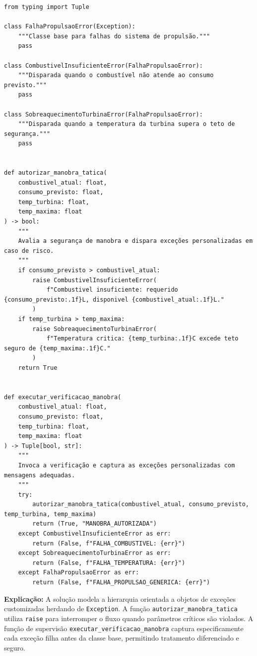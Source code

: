 \ifmostrarGabarito
\begin{verbatim}
from typing import Tuple

class FalhaPropulsaoError(Exception):
    """Classe base para falhas do sistema de propulsão."""
    pass

class CombustivelInsuficienteError(FalhaPropulsaoError):
    """Disparada quando o combustível não atende ao consumo previsto."""
    pass

class SobreaquecimentoTurbinaError(FalhaPropulsaoError):
    """Disparada quando a temperatura da turbina supera o teto de segurança."""
    pass


def autorizar_manobra_tatica(
    combustivel_atual: float,
    consumo_previsto: float,
    temp_turbina: float,
    temp_maxima: float
) -> bool:
    """
    Avalia a segurança de manobra e dispara exceções personalizadas em caso de risco.
    """
    if consumo_previsto > combustivel_atual:
        raise CombustivelInsuficienteError(
            f"Combustivel insuficiente: requerido {consumo_previsto:.1f}L, disponivel {combustivel_atual:.1f}L."
        )
    if temp_turbina > temp_maxima:
        raise SobreaquecimentoTurbinaError(
            f"Temperatura critica: {temp_turbina:.1f}C excede teto seguro de {temp_maxima:.1f}C."
        )
    return True


def executar_verificacao_manobra(
    combustivel_atual: float,
    consumo_previsto: float,
    temp_turbina: float,
    temp_maxima: float
) -> Tuple[bool, str]:
    """
    Invoca a verificação e captura as exceções personalizadas com mensagens adequadas.
    """
    try:
        autorizar_manobra_tatica(combustivel_atual, consumo_previsto, temp_turbina, temp_maxima)
        return (True, "MANOBRA_AUTORIZADA")
    except CombustivelInsuficienteError as err:
        return (False, f"FALHA_COMBUSTIVEL: {err}")
    except SobreaquecimentoTurbinaError as err:
        return (False, f"FALHA_TEMPERATURA: {err}")
    except FalhaPropulsaoError as err:
        return (False, f"FALHA_PROPULSAO_GENERICA: {err}")
\end{verbatim}

\textbf{Explicação:}
A solução modela a hierarquia orientada a objetos de exceções customizadas herdando de \texttt{Exception}. A função \texttt{autorizar\_manobra\_tatica} utiliza \texttt{raise} para interromper o fluxo quando parâmetros críticos são violados. A função de supervisão \texttt{executar\_verificacao\_manobra} captura especificamente cada exceção filha antes da classe base, permitindo tratamento diferenciado e seguro.
\fi
